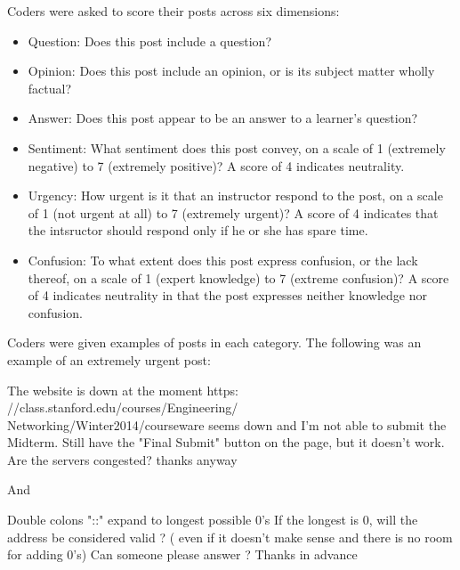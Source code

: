 \documentclass{edm_template}
\begin{document}
Coders were asked to score their posts across six dimensions:
\begin{itemize}
\vspace{-15pt}
       \setlength\itemsep{0.05em}
       \item Question: Does this post include a question?
       \item Opinion: Does this post include an opinion, or is its subject matter wholly factual?
       \item Answer: Does this post appear to be an answer to a learner's question?
       \item Sentiment: What sentiment does this post convey, on a scale of 1 (extremely negative) to 7 (extremely positive)? A score of 4 indicates neutrality.
       \item Urgency: How urgent is it that an instructor respond to the post, on a scale of 1 (not urgent at all) to 7 (extremely urgent)? A score of 4 indicates that the intsructor should respond only if he or she has spare time.
       \item Confusion: To what extent does this post express confusion, or the lack thereof, on a scale of 1 (expert knowledge) to 7 (extreme confusion)? A score of 4 indicates neutrality in that the post expresses neither knowledge nor confusion.
\end{itemize}
\vspace{-15pt}
Coders were given examples of posts in each category. The following was an example of an extremely urgent post:

\vspace{-14pt}
\begin{displayquote}
The website is down at the moment
       https:\\//class.stanford.edu/courses/Engineering/\\Networking/Winter2014/courseware
       seems down and I'm not able to submit the Midterm. Still have
       the "Final Submit" button on the page, but it doesn't work. Are
       the servers congested? 
       thanks anyway
\end{displayquote}
\vspace{-14pt}

And

\vspace{-14pt}
\begin{displayquote}
Double colons "::"  expand to longest possible 0's  
       If the longest is 0, will  the address be considered valid ?  (
       even if it doesn't make sense and there is no room for adding
       0's) 
       Can someone please answer ?
       Thanks in advance
\end{displayquote}
\vspace{-14pt}
\end{document}
